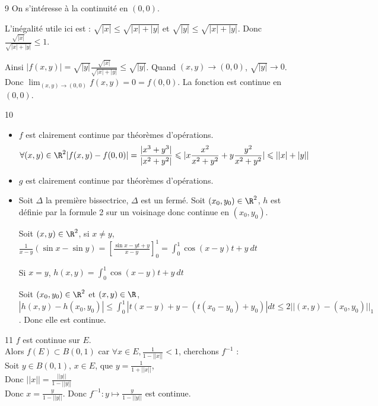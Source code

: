 \begin{correction}{9}
On s'intéresse à la continuité en $(0,0)$.

L'inégalité utile ici est : $\sqrt{|x|} \le \sqrt{|x|+|y|}$ et $\sqrt{|y|} \le \sqrt{|x|+|y|}$.
Donc $\frac{\sqrt{|x|}}{\sqrt{|x|+|y|}} \le 1$.

Ainsi $|f(x,y)| = \sqrt{|y|} \frac{\sqrt{|x|}}{\sqrt{|x|+|y|}} \le \sqrt{|y|}$.
Quand $(x,y) \to (0,0)$, $\sqrt{|y|} \to 0$.
Donc $\lim_{(x,y) \to (0,0)} f(x,y) = 0 = f(0,0)$.
La fonction est continue en $(0,0)$.
\end{correction}

\begin{correction}{10}
\begin{itemize}
    \item $f$ est clairement continue par théorèmes d'opérations.
    \[
        \forall (x,y) \in \R^2 | f(x,y) - f(0,0)| = \frac{|x^3 + y^3|}{|x^2 + y^2|} 
        \leqslant | x \frac {x^2} {x^2 + y^2} + y \frac{y^2}{x^2 + y^2} | 
        \leqslant ||x| + |y||
    \]

    \item $g$ est clairement continue par théorèmes d'opérations.
    \item Soit $\Delta$ la première bissectrice, $\Delta$ est un fermé.
    Soit $(x_0, y_0) \in \R^2$, $h$ est définie par la formule 2 sur un voisinage donc continue en $(x_0,y_0)$.

    Soit $(x,y) \in \R^2$, si $x \not \equal y$, $\frac 1 {x - y} (\sin x - \sin y) = [\frac{\sin{x-y}t + y}{x - y}]_0^1 = \int_0^1 \cos{(x-y)t + y}~dt$ 
    
    Si $x \equal y$, $h(x,y) = \int_0^1 \cos{(x-y)t + y}~dt$

    Soit $(x_0, y_0) \in \R^2$ et $(x,y) \in \R$, $|h(x,y) - h(x_0,y_0)| \leqslant \int_0^1 |t(x-y) + y - (t(x_0 - y_0) + y_0)|dt \leqslant 2 ||(x,y) - (x_0,y_0)||_1$. Donc elle est continue.
\end{itemize}
\end{correction}

\begin{correction}{11}
    $f$ est continue sur $E$. \\

    Alors $f(E) \subset B(0,1)$ car $\forall x \in E, \frac 1 {1 - ||x||} < 1$, cherchons $f^{-1}$ :\\

    Soit $y \in B(0,1)$, $x \in E$, que $ y = \frac 1 {1 + ||x||}$, \\

    Donc $||x|| = \frac{||y||}{1 - ||y||}$ \\

    Donc $x = \frac y {1 - ||y||}$. Donc $f^{-1} : y \mapsto \frac y {1 - ||y||}$ est continue.
\end{correction}

